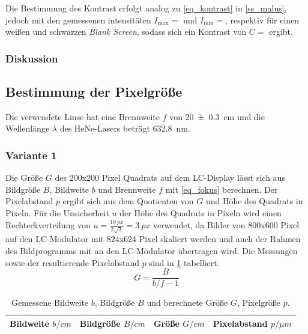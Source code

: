 \documentclass[
	a4paper,
	12pt,
	pagesize,
	ngerman
]{scrartcl}
\begin{document}
		Die Bestimmung des Kontrast erfolgt analog zu \cref{eq_kontrast} in \cref{ss_malus}, jedoch mit  den gemessenen intensitäten $I_\text{max}=$ und $I_\text{min}=$, respektiv für einen weißen und schwarzen \textit{Blank Screen}, sodass sich ein Kontrast von $C=$ ergibt.
			\subsubsection*{Diskussion}

		\subsection{Bestimmung der Pixelgröße} %
		Die verwendete Linse hat eine Brennweite $f$ von \SI{20+-0.3}{cm} und die Wellenlänge $\lambda$ des HeNe-Lasers beträgt \SI{632.8}{nm}.
			\subsubsection*{Variante 1}

			Die Größe $G$ des \SI{200}{}x\SI{200}{} Pixel Quadrats auf dem LC-Display lässt sich aus Bildgröße $B$, Bildweite $b$ und Brennweite $f$ mit \cref{eq_fokus} berechnen. %
			Der Pixelabstand $p$ ergibt sich aus dem Quotienten von $G$ und Höhe des Quadrats in Pixeln.
			Für die Unsicherheit $u$ der Höhe des Quadrats in Pixeln wird einen Rechteckverteilung  von $u = \frac{\SI{10}{px}}{2\sqrt{3}}= \SI{3}{px}$ verwendet, da Bilder von 800x600 Pixel auf den LC-Modulator mit 824x624 Pixel skaliert werden und auch der Rahmen des Bildprogramms mit an den LC-Modulator übertragen wird.
			Die Messungen sowie der resultierende Pixelabstand $p$ sind in \cref{tb_pixel} tabelliert.
			\begin{equation}
				\label{eq_fokus}
				G = \frac{B}{b/f-1}
			\end{equation}

\begin{table}[H]
		\centering
		\begin{tabular}{ c | c | c | c }
			 Bildweite $b/\si{cm}$ & Bildgröße $B/\si{cm}$ & Größe $G/\si{cm}$ & Pixelabstand $p/\si{\mu m}$ \\ \hline
			 
		\end{tabular}
		\caption{
		Gemessene Bildweite $b$, Bildgröße $B$ und berechnete Größe $G$, Pixelgröße $p$.
		}
		\label{tb_pixel}
\end{table}
\end{document}
